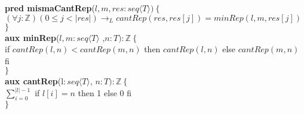 \documentclass[a4paper]{article}
\begin{document}
\begin{enumerate}[label=\alph*)]
			\textbf{pred mismaCantRep}($l,m,res:seq\langle T\rangle)
			\ \{$\smallskip \\
			\hspace*{6mm}$(\forall j:\mathbb{Z})(0\leq j<|res|)\rightarrow_L
			cantRep(res,res[j])=minRep(l,m,res[j])$\\
			$\}$\smallskip \\	
			
			\textbf{aux minRep}($l,m:seq\langle T\rangle$
				,$n:T ):\mathbb{Z}\ \{$\smallskip \\
			\hspace*{6mm}if $cantRep(l,n)<cantRep(m,n)$
				 then $cantRep(l,n)$ else $cantRep(m,n)$ fi\\
			$\}$\smallskip \\			
			
			\textbf{aux cantRep}(l$: seq\langle T\rangle$, $n:T):\mathbb{Z}
			\ \{$\smallskip \\
			\hspace*{6mm}$\sum_{i=0}^{|l|-1}$ if $l[i]=n$ then 1 else 0 fi\\
			$\}$\smallskip \\	
			
	\end{enumerate}
	
\end{document}
